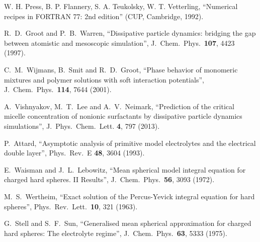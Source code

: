 \documentclass[12pt,a4paper]{article}
\begin{document}
 W. H. Press, B. P. Flannery, S. A. Teukolsky,
  W. T. Vetterling, ``Numerical recipes in FORTRAN 77: 2nd edition''
  (CUP, Cambridge, 1992).

 R.~D.~Groot and P.~B.~Warren, ``Dissipative particle
  dynamics: bridging the gap between atomistic and mesoscopic
  simulation'', J.\ Chem.\ Phys.\ {\bf107}, 4423 (1997).

 C.~M.~Wijmans, B.~Smit and R.~D.~Groot, ``Phase
  behavior of monomeric mixtures and polymer solutions with soft
  interaction potentials'', J.\ Chem.\ Phys.\ {\bf114}, 7644 (2001).

 A.~Vishnyakov, M.~T.~Lee and A.~V.~Neimark,
  ``Prediction of the critical micelle concentration of nonionic
  surfactants by dissipative particle dynamics simulations'',
  J.\ Phys.\ Chem.\ Lett. {\bf4}, 797 (2013).

 P.~Attard, ``Asymptotic analysis of primitive model
  electrolytes and the electrical double layer'', Phys.\ Rev.\ E
  {\bf48}, 3604 (1993).

 E.~Waisman and J.~L.~Lebowitz, ``Mean spherical model
  integral equation for charged hard spheres. II Results'',
  J.\ Chem.\ Phys.\ {\bf56}, 3093 (1972).

 M.~S.~Wertheim, ``Exact solution of the Percus-Yevick
  integral equation for hard spheres'', Phys.\ Rev.\ Lett.\ {\bf10},
  321 (1963).

 G.~Stell and S.~F.~Sun, ``Generalised mean spherical
  approximation for charged hard spheres: The electrolyte regime'',
  J.\ Chem.\ Phys.\ {\bf63}, 5333 (1975).
\end{document}
